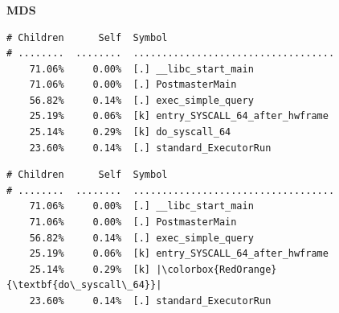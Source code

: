 \documentclass[usenames,dvipsnames, 18pt, compress, aspectratio=169]{beamer}
\begin{document}

\begin{frame}[fragile]{}
    \frametitle{}
    \begin{center}
    \textbf{MDS}

    \begin{overprint}
        \begin{verbatim}
# Children      Self  Symbol                                        
# ........  ........  ...................................
    71.06%     0.00%  [.] __libc_start_main
    71.06%     0.00%  [.] PostmasterMain
    56.82%     0.14%  [.] exec_simple_query
    25.19%     0.06%  [k] entry_SYSCALL_64_after_hwframe
    25.14%     0.29%  [k] do_syscall_64
    23.60%     0.14%  [.] standard_ExecutorRun
        \end{verbatim}

        \begin{verbatim}
# Children      Self  Symbol                                        
# ........  ........  ...................................
    71.06%     0.00%  [.] __libc_start_main
    71.06%     0.00%  [.] PostmasterMain
    56.82%     0.14%  [.] exec_simple_query
    25.19%     0.06%  [k] entry_SYSCALL_64_after_hwframe
    25.14%     0.29%  [k] |\colorbox{RedOrange}{\textbf{do\_syscall\_64}}|
    23.60%     0.14%  [.] standard_ExecutorRun
        \end{verbatim}


    \end{overprint}
    \end{center}
\end{frame}
\end{document}
